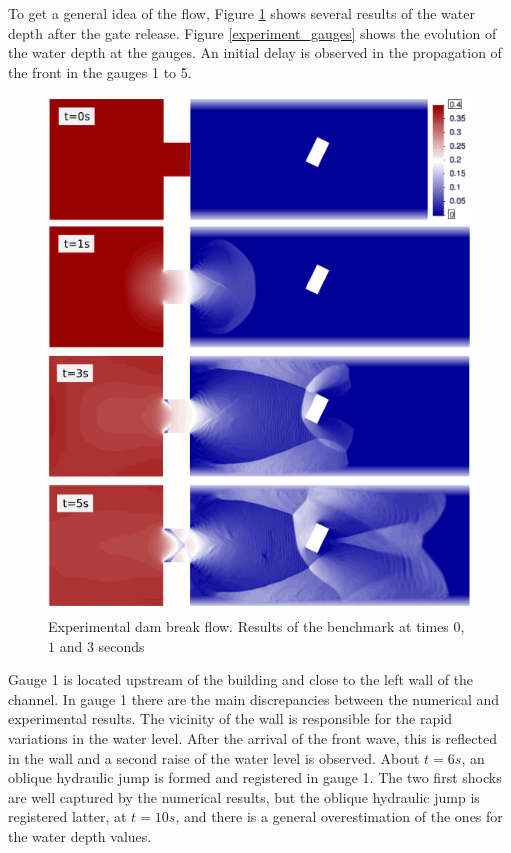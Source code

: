 \documentclass[a4paper,12pt]{elsarticle}
\begin{document}
To get a general idea of the flow, Figure \ref{experiment_plots} shows several results of the water depth after the gate release. Figure \ref{experiment_gauges} shows the evolution of the water depth at the gauges. An initial delay is observed in the propagation of the front in the gauges 1 to 5.

\begin{figure}
\centering
\includegraphics[width=\textwidth]{img/exp/results.png}
\caption{Experimental dam break flow. Results of the benchmark at times $0$, $1$ and $3$ seconds}
\label{experiment_plots}
\end{figure}


Gauge 1 is located upstream of the building and close to the left wall of the channel. In gauge 1 there are the main discrepancies between the numerical and experimental results. The vicinity of the wall is responsible for the rapid variations in the water level. After the arrival of the front wave, this is reflected in the wall and a second raise of the water level is observed. About $t=6s$, an oblique hydraulic jump is formed and registered in gauge 1. The two first shocks are well captured by the numerical results, but the oblique hydraulic jump is registered latter, at $t=10s$, and there is a general overestimation of the ones for the water depth values.
\end{document}
